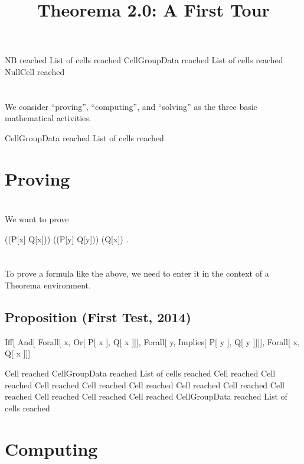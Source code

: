 \documentclass{article}
\newcommand{\light}[1]{{\color{lightgray}#1}}
\begin{document}
% 

\title{Theorema 2.0: A First Tour}
\author{}
\date{}
\maketitle

\light{NB reached} \light{List of cells reached} \light{CellGroupData reached} \light{List of cells reached} Null\light{Cell reached} \begingroup \section*{} We consider “proving”, “computing”, and “solving” as the three basic mathematical activities.\endgroup 

\light{CellGroupData reached} \light{List of cells reached} \section{Proving}

\begingroup \section*{} We want to prove\endgroup 

\begin{center}((P[x] \lor Q[x])) \land ((P[y] \Rightarrow Q[y])) \Leftrightarrow (Q[x]) .\end{center}
\begingroup \section*{} To prove a formula like the above, we need to enter it in the context of a Theorema environment.\endgroup 

\begin{openenvironment}
\end{openenvironment}\begin{tmaenvironment}
\subsection{Proposition (First Test, 2014)}
 Iff[ And[ Forall[ x,  Or[ P[  x ],  Q[  x ]]],  Forall[ y,  Implies[ P[  y ],  Q[  y ]]]],  Forall[ x,  Q[  x ]]]\end{tmaenvironment}
\light{Cell reached} \light{CellGroupData reached} \light{List of cells reached} \light{Cell reached} \light{Cell reached} \light{Cell reached} \light{Cell reached} \light{Cell reached} \light{Cell reached} \light{Cell reached} \light{Cell reached} \light{Cell reached} \light{Cell reached} \light{Cell reached} \light{CellGroupData reached} \light{List of cells reached} \section{Computing}
\end{document}
